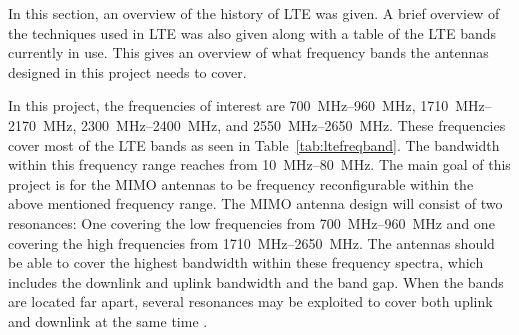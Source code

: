 \begin{aautail}
    In this section, an overview of the history of LTE was given. A brief overview of the techniques used in LTE was also given along with a table of the LTE bands currently in use. This gives an overview of what frequency bands the antennas designed in this project needs to cover.

    In this project, the frequencies of interest are \SIrange{700}{960}{MHz}, \SIrange{1710}{2170}{MHz}, \SIrange{2300}{2400}{MHz}, and \SIrange{2550}{2650}{MHz}. These frequencies cover most of the LTE bands as seen in Table~\ref{tab:ltefreqband}. The bandwidth within this frequency range reaches from \SIrange{10}{80}{MHz}. The main goal of this project is for the MIMO antennas to be frequency reconfigurable within the above mentioned frequency range. The MIMO antenna design will consist of two resonances: One covering the low frequencies from \SIrange{700}{960}{MHz} and one covering the high frequencies from \SIrange{1710}{2650}{MHz}. The antennas should be able to cover the highest bandwidth within these frequency spectra, which includes the downlink and uplink bandwidth and the band gap. When the bands are located far apart, several resonances may be exploited to cover both uplink and downlink at the same time \cite{radio2015electronics}.
\end{aautail}
